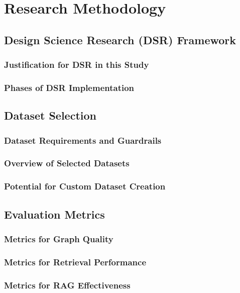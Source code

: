 \section{Research Methodology}
\subsection{Design Science Research (DSR) Framework}
\subsubsection{Justification for DSR in this Study}
\subsubsection{Phases of DSR Implementation}
\subsection{Dataset Selection}
\subsubsection{Dataset Requirements and Guardrails}
\subsubsection{Overview of Selected Datasets}
\subsubsection{Potential for Custom Dataset Creation}
\subsection{Evaluation Metrics}
\subsubsection{Metrics for Graph Quality}
\subsubsection{Metrics for Retrieval Performance}
\subsubsection{Metrics for RAG Effectiveness}
